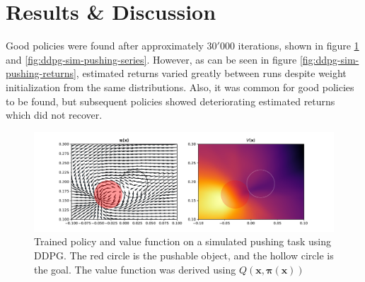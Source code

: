 \section{Results \& Discussion}

Good policies were found after approximately $30'000$ iterations, shown in
figure \ref{fig:ddpg-sim-pushing-pi-v} and \ref{fig:ddpg-sim-pushing-series}.
However, as can be seen in figure \ref{fig:ddpg-sim-pushing-returns}, estimated
returns varied greatly between runs despite weight initialization from the same
distributions. Also, it was common for good policies to be found, but
subsequent policies showed deteriorating estimated returns which did not
recover.

\begin{figure}[h!]
    \centering
    \includegraphics[width=1.0 \textwidth]{res/ddpg-pushing-pi-v.pdf}

    \caption{Trained policy and value function on a simulated pushing task
    using DDPG. The red circle is the pushable object, and the hollow circle is
    the goal. The value function was derived using $Q(\mathbf{x, \pi(x)})$}

    \label{fig:ddpg-sim-pushing-pi-v}

\end{figure}

